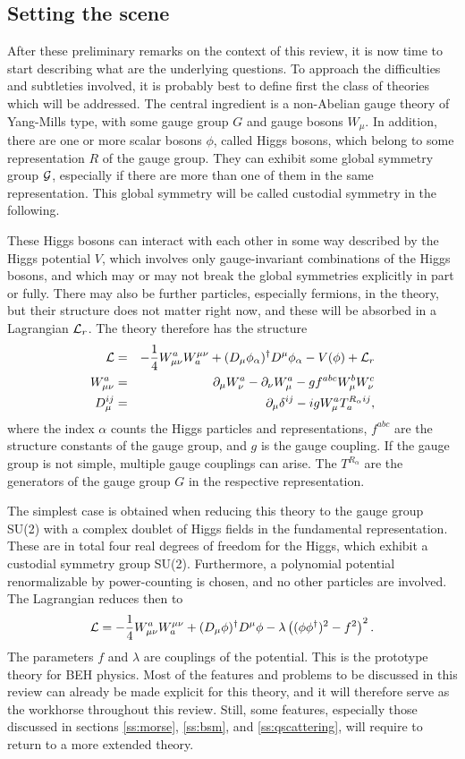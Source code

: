 \documentclass[final,12pt]{article}
\newcommand*{\La}{{\cal{L}}}
\newcommand*{\no}{\noindent}
\newcommand*{\bea}{\begin{eqnarray}}
\newcommand*{\eea}{\end{eqnarray}}
\newcommand*{\be}{\begin{equation}}
\newcommand*{\ee}{\end{equation}}
\newcommand*{\pd}{\partial}
\newcommand*{\pdm}{\pd_{\mu}}
\newcommand*{\pdn}{\pd_{\nu}}
\newcommand*{\mn}{{\mu\nu}}
\newcommand*{\nn}{\nonumber}
\newcommand*{\1}{1\!\!\!\bot}
\begin{document}
\subsection{Setting the scene}

After these preliminary remarks on the context of this review, it is now time to start describing what are the underlying questions. To approach the difficulties and subtleties involved, it is probably best to define first the class of theories which will be addressed. The central ingredient is a non-Abelian gauge theory of Yang-Mills type, with some gauge group $G$ and gauge bosons $W_\mu$. In addition, there are one or more scalar bosons $\phi$, called Higgs bosons, which belong to some representation $R$ of the gauge group. They can exhibit some global symmetry group ${\cal G}$, especially if there are more than one of them in the same representation. This global symmetry will be called custodial symmetry in the following.

These Higgs bosons can interact with each other in some way described by the Higgs potential $V$, which involves only gauge-invariant combinations of the Higgs bosons, and which may or may not break the global symmetries explicitly in part or fully. There may also be further particles, especially fermions, in the theory, but their structure does not matter right now, and these will be absorbed in a Lagrangian ${\La}_r$. The theory therefore has the structure
\bea
{\La}&=&-\frac{1}{4}W_\mn^aW^\mn_a+(D_\mu\phi_\alpha)^\dagger D^\mu\phi_\alpha-V(\phi)+{\La}_r\label{la:gen}\\
W_\mn^a&=&\pdm W_\nu^a-\pdn W_\mu^a-g f^{abc} W_\mu^b W_\nu^c\nn\\
D_\mu^{ij}&=&\pd_\mu\delta^{ij}-igW_\mu^aT^{R_\alpha ij}_a\label{covderiv},
\eea
\no where the index $\alpha$ counts the Higgs particles and representations, $f^{abc}$ are the structure constants of the gauge group, and $g$ is the gauge coupling. If the gauge group is not simple, multiple gauge couplings can arise. The $T^{R_\alpha}$ are the generators of the gauge group $G$ in the respective representation.

The simplest case is obtained when reducing this theory to the gauge group SU(2) with a complex doublet of Higgs fields in the fundamental representation. These are in total four real degrees of freedom for the Higgs, which exhibit a custodial symmetry group SU(2). Furthermore, a polynomial potential renormalizable by power-counting is chosen, and no other particles are involved. The Lagrangian reduces then to
\be
\La=-\frac{1}{4}W_\mn^aW^\mn_a+(D_\mu\phi)^\dagger D^\mu\phi-\lambda\left((\phi\phi^\dagger)^2-f^2\right)^2\label{la:beh}.
\ee
\no The parameters $f$ and $\lambda$ are couplings of the potential. This is the prototype theory for BEH physics. Most of the features and problems to be discussed in this review can already be made explicit for this theory, and it will therefore serve as the workhorse throughout this review. Still, some features, especially those discussed in sections \ref{ss:morse}, \ref{ss:bsm}, and \ref{ss:qscattering}, will require to return to a more extended theory.
\end{document}
